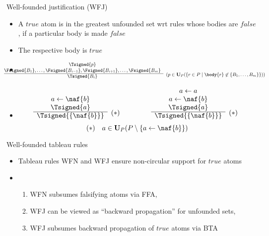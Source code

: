 \begin{frame}{Well-founded justification (WFJ)}
\begin{itemize}
\item {} A $\mathit{true}$ atom is in the greatest unfounded set wrt rules whose bodies are $\mathit{false}$,
  if a particular body is made $\mathit{false}$
\item {} The respective body is $\mathit{true}$
\item {} %
\[
\hspace{-10mm}
{\small
\begin{array}{@{}cl}
\Tsigned{p} \\
\Fsigned{B_1},\dots,\Fsigned{B_{i-1}},\Fsigned{B_{i+1}},\dots,\Fsigned{B_m} &
\raisebox{-8pt}[0pt][0pt]{($p \in \mathbf{U}_P(\{r \in P \mid \body{r} \not\in \{B_1,\dots,B_m\}\})$)}
\\\cline{1-1}
\Tsigned{B_i}
\end{array}
}
\]
\item<2->  %
\[
\begin{array}[b]{cl}
a \leftarrow \naf{b} \\
\Tsigned{a} &
\raisebox{-8pt}[0pt][0pt]{$(*)$}
\\\cline{1-1}
\Tsigned{\{\naf{b}\}}
\end{array}
\qquad\qquad
\begin{array}[b]{cl}
a \leftarrow a \\
a \leftarrow \naf{b} \\
\Tsigned{a} &
\raisebox{-8pt}[0pt][0pt]{$(*)$}
\\\cline{1-1}
\Tsigned{\{\naf{b}\}}
\end{array}
\hfill
\]
\[
\hfill
(*)\quad a \in \mathbf{U}_P(P \setminus \{a \leftarrow \naf{b}\})
\hfill\hfill
\]
\end{itemize}
\end{frame}
\begin{frame}{Well-founded tableau rules}
  \begin{itemize}
  \item<1-> Tableau rules WFN and WFJ ensure non-circular support for $\mathit{true}$ atoms
  \item <2-> 
    \begin{enumerate}
    \item WFN subsumes falsifying atoms via FFA,
    \item WFJ can be viewed as ``backward propagation'' for unfounded sets,
    \item WFJ subsumes backward propagation of $\mathit{true}$ atoms via BTA
    \end{enumerate}
  \end{itemize}
\end{frame}
